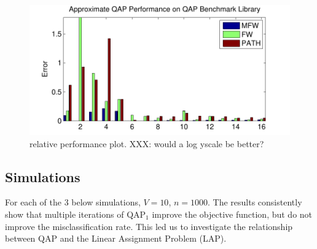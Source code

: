 \documentclass{article} %
\begin{document}
\begin{figure}[htbp]
	\centering			
	\includegraphics[width=1.0\linewidth]{../figs/benchmarks.pdf}
	\caption{relative performance plot. XXX: would a log yscale be better?}
	\label{fig:fwpath}
\end{figure}




\subsection{Simulations}

For each of the 3 below simulations, $V=10$, $n=1000$.  The results consistently show that multiple iterations of QAP$_1$ improve the objective function, but do not improve the misclassification rate.  This led us to investigate the relationship between QAP and the Linear Assignment Problem (LAP).
\end{document}
